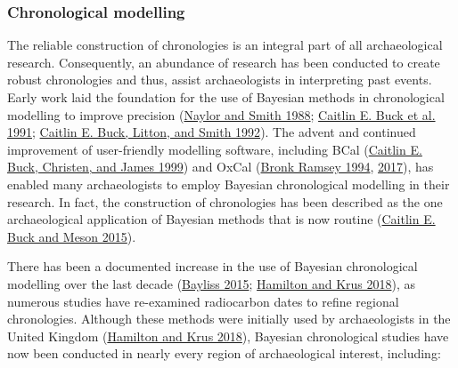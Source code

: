 \documentclass[
]{article}
\begin{document}
\hypertarget{chronological-modelling}{%
\subsubsection{Chronological modelling}\label{chronological-modelling}}

The reliable construction of chronologies is an integral part of all
archaeological research. Consequently, an abundance of research has been
conducted to create robust chronologies and thus, assist archaeologists
in interpreting past events. Early work laid the foundation for the use
of Bayesian methods in chronological modelling to improve precision
(\protect\hyperlink{ref-naylor_archaeological_1988}{Naylor and Smith
1988}; \protect\hyperlink{ref-buck_combining_1991}{Caitlin E. Buck et
al. 1991}; \protect\hyperlink{ref-buck_calibration_1992}{Caitlin E.
Buck, Litton, and Smith 1992}). The advent and continued improvement of
user-friendly modelling software, including BCal
(\protect\hyperlink{ref-buck_bcal_1999}{Caitlin E. Buck, Christen, and
James 1999}) and OxCal
(\protect\hyperlink{ref-bronk_ramsey_analysis_1994}{Bronk Ramsey 1994},
\protect\hyperlink{ref-bronk_ramsey_methods_2017}{2017}), has enabled
many archaeologists to employ Bayesian chronological modelling in their
research. In fact, the construction of chronologies has been described
as the one archaeological application of Bayesian methods that is now
routine (\protect\hyperlink{ref-buck_being_2015}{Caitlin E. Buck and
Meson 2015}).

There has been a documented increase in the use of Bayesian
chronological modelling over the last decade
(\protect\hyperlink{ref-bayliss_quality_2015}{Bayliss 2015};
\protect\hyperlink{ref-hamilton_myths_2018}{Hamilton and Krus 2018}), as
numerous studies have re-examined radiocarbon dates to refine regional
chronologies. Although these methods were initially used by
archaeologists in the United Kingdom
(\protect\hyperlink{ref-hamilton_myths_2018}{Hamilton and Krus 2018}),
Bayesian chronological studies have now been conducted in nearly every
region of archaeological interest, including:
\end{document}
